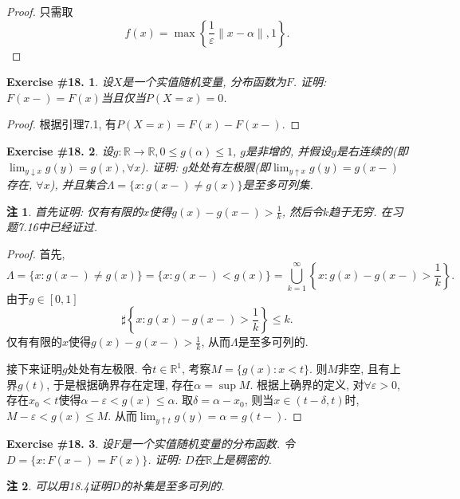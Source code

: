 \documentclass[UTF8, a4paper]{article}
\newtheorem{exercise}{Exercise \#18.}
\newtheorem*{remark}{注}
\begin{document}
\begin{proof}
只需取
$$
f(x) = \max \left\{\frac{1}{\varepsilon} \|x - \alpha\|,  1\right\}.
$$
\end{proof}


\begin{framed}
\begin{exercise}
设\(X\)是一个实值随机变量, 分布函数为\(F\). 证明: \(F(x-) = F(x)\)当且仅当\(P(X = x) = 0\).
\end{exercise}
\end{framed}
\begin{proof}
    根据引理7.1, 有\(P(X = x) = F(x) - F(x-)\).
\end{proof}

\begin{framed}
\begin{exercise}
设\(g: \mathbb{R} \to \mathbb{R}, 0 \leq g(\alpha) \leq 1\), \(g\)是非增的, 并假设\(g\)是右连续的(即\(\lim_{y \downarrow x}g(y) = g(x), \forall x \)).
证明: \(g\)处处有左极限(即\(\lim_{y \uparrow x}g(y) = g(x-)\)存在, \(\forall x\)), 并且集合\(\Lambda = \{x: g(x-) \neq g(x)\}\)是至多可列集.
\end{exercise}
\end{framed}

\begin{remark}
首先证明: 仅有有限的\(x\)使得\(g(x) - g(x-) > \frac{1}{k}\), 然后令\(k\)趋于无穷. 在习题7.16中已经证过.
\end{remark}

\begin{proof}
首先, 
$$
\Lambda = \{x: g(x-) \neq g(x)\} = \{x: g(x-) < g(x)\} = \bigcup_{k=1}^{\infty}\left\{x: g(x) - g(x-) > \frac{1}{k}\right\}.
$$
由于\(g \in [0,1]\)
$$
\sharp \left\{x: g(x) - g(x-) > \frac{1}{k}\right\} \leq k.
$$
仅有有限的\(x\)使得\(g(x) - g(x-) > \frac{1}{k}\), 从而\(\Lambda\)是至多可列的.

接下来证明\(g\)处处有左极限. 令\(t \in \mathbb{R}^1\), 考察\(M = \{g(x): x < t\}\).
则\(M\)非空, 且有上界\(g(t)\), 于是根据确界存在定理, 存在\(\alpha = \sup M\).
根据上确界的定义, 对\(\forall \varepsilon > 0\), 存在\(x_0 < t\)使得\(\alpha - \varepsilon < g(x) \leq \alpha\).
取\(\delta = \alpha - x_0\), 则当\(x \in (t - \delta, t)\)时, \(M-\varepsilon < g(x) \leq M\).
从而\(\lim_{y \uparrow t}g(y) = \alpha = g(t-)\).
\end{proof}


\begin{framed}
\begin{exercise}
设\(F\)是一个实值随机变量的分布函数. 令\(D = \{x : F(x - ) = F(x)\}\).
证明: \(D\)在\(\mathbb{R}\)上是稠密的.
\end{exercise}
\end{framed}
\begin{remark}
可以用18.4证明\(D\)的补集是至多可列的.
\end{remark}
\end{document}
